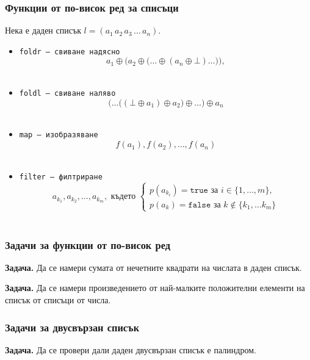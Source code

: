 \documentclass{beamer}
\begin{document}
\begin{frame}
  \frametitle{Функции от по-висок ред за списъци}

  Нека е даден списък $l = (a_1\,a_2\,a_3\,\ldots\,a_n)$.

  \begin{itemize}[<+->]
  \item \tt{foldr} --- свиване надясно
    \begin{equation*}
      a_1 \oplus \Big(a_2 \oplus \big(\ldots \oplus (a_n \oplus \bot) \ldots\big)\Big),
    \end{equation*}
  \item \tt{foldl} --- свиване наляво
    \begin{equation*}
      \Big(\ldots\big((\bot \oplus a_1) \oplus a_2\big) \oplus \ldots\Big) \oplus a_n
    \end{equation*}
  \item \tt{map} --- изобразяване
    \begin{equation*}
      f(a_1), f(a_2), \ldots, f(a_n)
    \end{equation*}
  \item \tt{filter} --- филтриране
    \begin{equation*}
      a_{k_1}, a_{k_2}, \ldots, a_{k_m},\text{ където }\left\{
      \begin{array}{l}
        p(a_{k_i})=\mathtt{true}\text{ за }i\in\{1,\ldots,m\},\\
        p(a_k)=\mathtt{false}\text{ за }k\notin\{k_1,\ldots k_m\}
      \end{array}\right.
    \end{equation*}
  \end{itemize}
\end{frame}

\begin{frame}
  \frametitle{Задачи за функции от по-висок ред}

  \textbf{Задача.} Да се намери сумата от нечетните квадрати на числата в даден списък.
  \vspace{3em}
  \pause

  \textbf{Задача.} Да се намери произведението от най-малките положителни елементи на списък от списъци от числа.
\end{frame}

\begin{frame}
  \frametitle{Задачи за двусвързан списък}

  \textbf{Задача.} Да се провери дали даден двусвързан списък е палиндром.
\end{frame}
\end{document}
